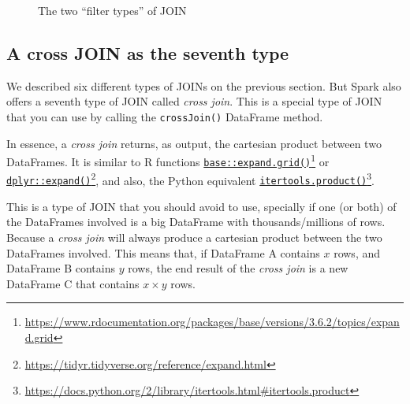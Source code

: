 \documentclass[
  11pt,
  letterpaper,
  DIV=11,
  numbers=noendperiod]{scrreprt}
\begin{document}
\begin{figure}


\caption{\label{fig-join-sets2}The two ``filter types'' of JOIN}

\end{figure}%

\subsection{A cross JOIN as the seventh
type}\label{a-cross-join-as-the-seventh-type}

We described six different types of JOINs on the previous section. But
Spark also offers a seventh type of JOIN called \emph{cross join}. This
is a special type of JOIN that you can use by calling the
\texttt{crossJoin()} DataFrame method.

In essence, a \emph{cross join} returns, as output, the cartesian
product between two DataFrames. It is similar to R functions
\href{https://www.rdocumentation.org/packages/base/versions/3.6.2/topics/expand.grid}{\texttt{base::expand.grid()}}\footnote{\url{https://www.rdocumentation.org/packages/base/versions/3.6.2/topics/expand.grid}}
or
\href{https://tidyr.tidyverse.org/reference/expand.html}{\texttt{dplyr::expand()}}\footnote{\url{https://tidyr.tidyverse.org/reference/expand.html}},
and also, the Python equivalent
\href{https://docs.python.org/2/library/itertools.html\#itertools.product}{\texttt{itertools.product()}}\footnote{\url{https://docs.python.org/2/library/itertools.html\#itertools.product}}.

This is a type of JOIN that you should avoid to use, specially if one
(or both) of the DataFrames involved is a big DataFrame with
thousands/millions of rows. Because a \emph{cross join} will always
produce a cartesian product between the two DataFrames involved. This
means that, if DataFrame A contains \(x\) rows, and DataFrame B contains
\(y\) rows, the end result of the \emph{cross join} is a new DataFrame C
that contains \(x \times y\) rows.
\end{document}
